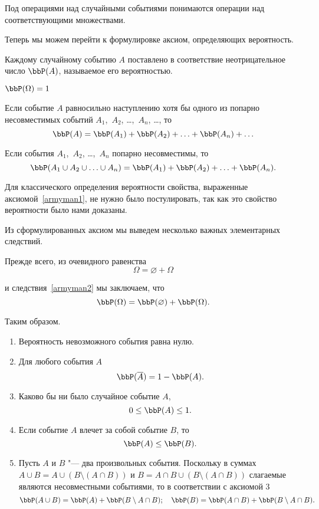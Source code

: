 Под операциями над случайными событиями понимаются операции над соответствующими множествами. 

Теперь мы можем перейти к формулировке аксиом, определяющих вероятность.
\begin{axiome} 
Каждому случайному событию $A$ поставлено в соответствие неотрицательное число $\bbP(A)$, называемое его вероятностью.
\end{axiome}
\begin{axiome} \label{armyman1}
$\bbP(\Omega) = 1$
\end{axiome}
\begin{axiome}
Если событие $A$ равносильно наступлению хотя бы одного из попарно несовместимых событий $A_1$,~$A_2$, \ldots,~$A_n$, \ldots, то
$$
\bbP(A) = \bbP(A_1) + \bbP(A_2) + \ldots + \bbP(A_n) + \ldots
$$
\end{axiome}
\begin{cons}\label{armyman2} 
Если события $A_1$,~$A_2$, \ldots,~$A_n$ попарно несовместимы, то 
$$
\bbP(A_1 \cup A_2 \cup \ldots \cup A_n) = \bbP(A_1) + \bbP(A_2) + \ldots + \bbP(A_n).
$$
\end{cons}
Для классического определения вероятности свойства, выраженные аксиомой~\ref{armyman1}, не нужно было постулировать, так как это свойство вероятности было нами доказаны.

Из сформулированных аксиом мы выведем несколько важных элементарных следствий.

Прежде всего, из очевидного равенства
$$
\Omega = \varnothing + \Omega
$$

и следствия~\ref{armyman2} мы заключаем, что
$$
\bbP(\Omega) = \bbP(\varnothing) + \bbP(\Omega).
$$

Таким образом.
\begin{enumerate}
\item
Вероятность невозможного события равна нулю.
\item	
Для любого события $A$
$$
\bbP(\overline{A}) = 1 - \bbP(A).
$$
\item
Каково бы ни было случайное событие $A$,
$$
0 \le \bbP(A) \le 1.
$$
\item
Если событие $A$ влечет за собой событие $B$, то
$$
\bbP(A) \le \bbP(B).
$$
\item
Пусть $A$ и $B$ "--- два произвольных события. Поскольку в суммах $A \cup B = A \cup (B \setminus (A\cap B))$ и $B = A\cap B \cup (B \setminus (A\cap B))$ слагаемые являются несовместными событиями, то в соответствии с аксиомой 3
$$
\bbP(A \cup B) = \bbP(A) + \bbP(B \setminus A\cap B);\quad \bbP(B) = \bbP(A\cap B) + \bbP(B \setminus A\cap B).
$$
\end{enumerate}

